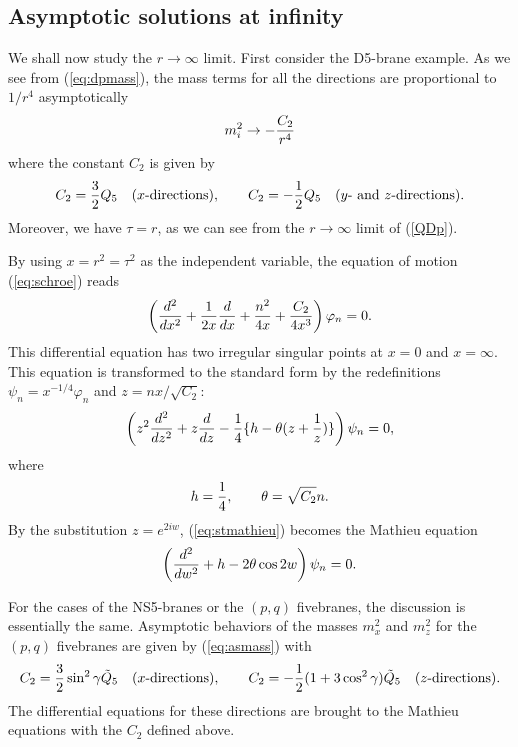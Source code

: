 \documentclass[a4paper,12pt]{article}
\begin{document}
\subsection{Asymptotic solutions at infinity}
We shall now study the $r\rightarrow\infty$ limit.
First consider the D5-brane example.
As we see from (\ref{eq:dpmass}), the mass terms for all the
directions are proportional to $1/r^4$ asymptotically
\begin{equation}
m^{2}_{i}\rightarrow -{C_{2} \over r^4}
\label{eq:asmass}
\end{equation}
where the constant $C_{2}$ is given by
\begin{equation}
C_{2}={3\over 2}Q_{5}\quad\mbox{($x$-directions)},\qquad 
C_{2}=-{1\over 2}Q_{5}\quad\mbox{($y$- and $z$-directions)}.
\end{equation}
Moreover, we have $\tau=r$, as we can see from 
the $r\rightarrow\infty$ limit of (\ref{QDp}).

By using $x=r^2=\tau^2$ as the independent variable,
the equation of motion (\ref{eq:schroe}) reads
\begin{equation}
\left({d^2\over dx^2} + {1\over 2x}{d\over dx}
+{n^2\over 4x}+ {C_{2} \over 4x^3}\right) \varphi_{n}=0.
\end{equation}
This differential equation has two irregular singular
points at $x=0$ and $x=\infty$. This equation is transformed 
to the standard form \cite{In} by the redefinitions 
$\psi_{n}=x^{-1/4}\varphi_{n}$ and $z=nx/\sqrt{C_{2}}$:
\begin{equation}
\left(z^2 {d^2\over dz^2} + z{d\over dz}
-{1\over 4}\{ h -\theta (z+{1\over z})\}\right)
\psi_{n}=0,
\label{eq:stmathieu}
\end{equation}
where 
\begin{equation}
h={1\over 4},\qquad \theta=\sqrt{C_{2}} n.
\end{equation}
By the substitution $z=e^{2iw}$, (\ref{eq:stmathieu}) becomes
the Mathieu equation \cite{Er}
\begin{equation}
\left({d^2\over dw^2}+h-2\theta \cos 2w\right)\psi_{n}=0.
\label{eq:mathieu2}
\end{equation}

For the cases of the NS5-branes or the $(p,q)$ fivebranes, 
the discussion is essentially the same.
Asymptotic behaviors of the masses $m^{2}_{x}$
and $m^{2}_{z}$ for the $(p,q)$ fivebranes
are given by (\ref{eq:asmass}) with
\begin{equation}
C_{2}={3\over 2}\sin^2\gamma\tilde{Q}_{5}\quad 
\mbox{($x$-directions)},\qquad
C_{2}=-{1\over 2}(1+3\cos^2\gamma)\tilde{Q}_{5}\quad 
\mbox{($z$-directions)}.
\end{equation}
The differential equations for these directions
are brought to the Mathieu equations 
with the $C_{2}$ defined above.
\end{document}
